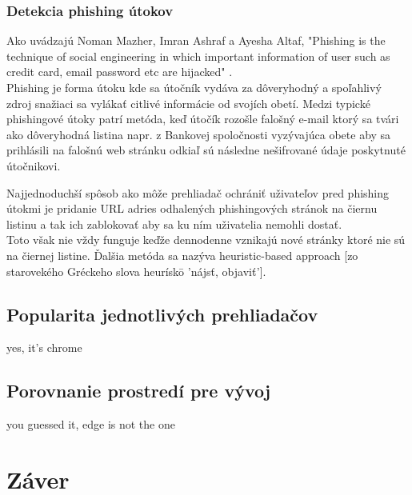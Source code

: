\documentclass[10pt,Slovak,a4paper]{article}
\begin{document}
        \subsubsection{Detekcia phishing útokov}
            \begin{paragraph}
                Ako uvádzajú Noman Mazher, Imran Ashraf a Ayesha Altaf, "Phishing is the technique of social engineering in which important information of user such as credit card, email password etc are hijacked" \cite{6732784}. \\ Phishing je forma útoku kde sa útočník vydáva za dôveryhodný a spoľahlivý zdroj snažiaci sa vylákať citlivé informácie od svojích obetí. Medzi typické phishingové útoky patrí metóda, keď útočík rozošle falošný e-mail ktorý sa tvári ako dôveryhodná listina napr. z Bankovej spoločnosti vyzývajúca obete aby sa prihlásili na falošnú web stránku odkiaľ sú následne nešifrované údaje poskytnuté útočnikovi.
            \end{paragraph}
            \begin{paragraph}
                Najjednoduchší spôsob ako môže prehliadač ochrániť uživateľov pred phishing útokmi je pridanie URL adries odhalených phishingových stránok na čiernu listinu a tak ich zablokovať aby sa ku ním uživatelia nemohli dostať. \\
                Toto však nie vždy funguje keďže dennodenne vznikajú nové stránky ktoré nie sú na čiernej listine. Ďalšia metóda sa nazýva heuristic-based approach [zo starovekého Gréckeho slova heurískō 'nájsť, objaviť']. 
            \end{paragraph}


        
    \subsection{Popularita jednotlivých prehliadačov}
        yes, it's chrome
    \subsection{Porovnanie prostredí pre vývoj}
        you guessed it, edge is not the one




\section{Záver} \label{zaver} %








\pagebreak

\end{document}
